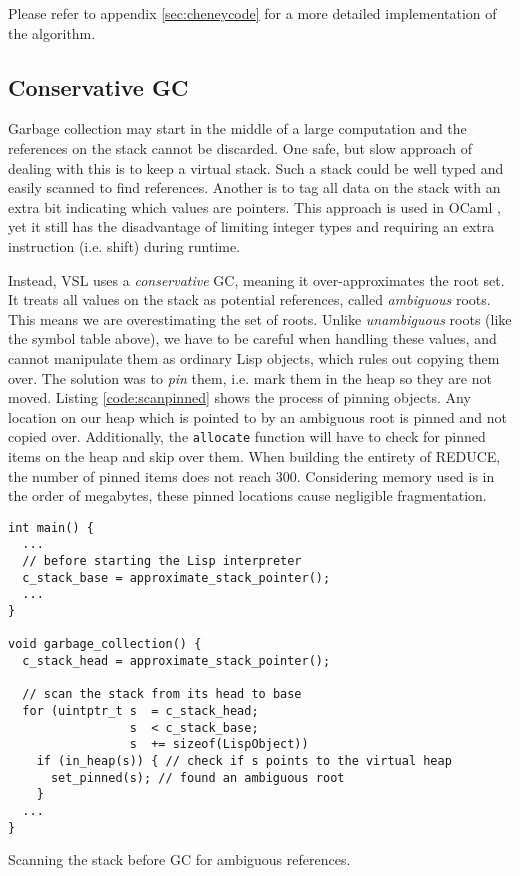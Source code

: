 Please refer to appendix \ref{sec:cheneycode} for a more detailed implementation of the algorithm.

\subsection{Conservative GC}

Garbage collection may start in the middle of a large computation and the references on the stack cannot be discarded.
One safe, but slow approach of dealing with this is to keep a virtual stack. Such a stack could be well typed and easily scanned to find
references. Another is to tag all data on the stack with an extra bit indicating which values are pointers. This approach
is used in OCaml \cite[Chapter~20]{rwoc}, yet it still has the disadvantage of limiting integer types and requiring an extra
instruction (i.e. shift) during runtime.

Instead, VSL uses a \emph{conservative} GC, meaning it over-approximates the root set.
It treats all values on the stack as potential references, called \emph{ambiguous} roots.
This means we are overestimating the set of roots. Unlike \emph{unambiguous} roots (like the symbol table above), we
have to be careful when handling these values, and cannot manipulate them as ordinary Lisp objects, which rules out
copying them over. The solution was
to \emph{pin} them, i.e. mark them in the heap so they are not moved. Listing \ref{code:scanpinned} 
shows the process of pinning objects.
Any location on our heap which is pointed to by an ambiguous root is pinned and not copied over.
Additionally, the \texttt{allocate} function will have to check for pinned items on the heap and skip over them.
When building the entirety of REDUCE, the number of pinned items does not reach 300.
Considering memory used is in the order of megabytes, these pinned locations cause negligible fragmentation.

\begin{code}
\begin{verbatim}
int main() {
  ...
  // before starting the Lisp interpreter
  c_stack_base = approximate_stack_pointer();
  ...
}

void garbage_collection() {
  c_stack_head = approximate_stack_pointer();

  // scan the stack from its head to base
  for (uintptr_t s  = c_stack_head;
                 s  < c_stack_base;
                 s  += sizeof(LispObject))
    if (in_heap(s)) { // check if s points to the virtual heap
      set_pinned(s); // found an ambiguous root
    }
  ...
}
\end{verbatim}
\caption{Scanning the stack before GC for ambiguous references.}
\label{code:scanpinned}
\end{code}

